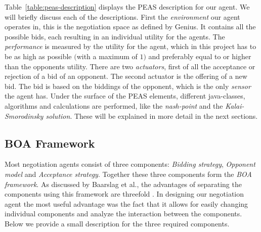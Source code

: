 \documentclass[a4paper,10pt]{article}
\begin{document}
Table~\ref{table:peas-description} displays the PEAS description for our agent. We will briefly discuss each of the descriptions. First the \emph{environment} our agent operates in, this is the negotiation space as defined by Genius. It contains all the possible bids, each resulting in an individual utility for the agents. The \emph{performance} is measured by the utility for the agent, which in this project has to be as high as possible $($with a maximum of $1)$ and preferably equal to or higher than the opponents utility. There are two \emph{actuators}, first of all the acceptance or rejection of a bid of an opponent. The second actuator is the offering of a new bid. The bid is based on the biddings of the opponent, which is the only \emph{sensor} the agent has. Under the surface of the PEAS elements, different java-classes, algorithms and calculations are performed, like the \textit{nash-point} and the \textit{Kalai-Smorodinsky solution}. These will be explained in more detail in the next sections.

\subsection{BOA Framework}

Most negotiation agents consist of three components: \emph{Bidding strategy}, \emph{Opponent model} and \emph{Acceptance strategy}. Together these three components form the \emph{BOA framework}. As discussed by Baarslag et al., the advantages of separating the components using this framework are threefold \cite{baarslag2012decoupling}. In designing our negotiation agent the most useful advantage was the fact that it allows for easily changing individual components and analyze the interaction between the components. Below we provide a small description for the three required components.
\end{document}
